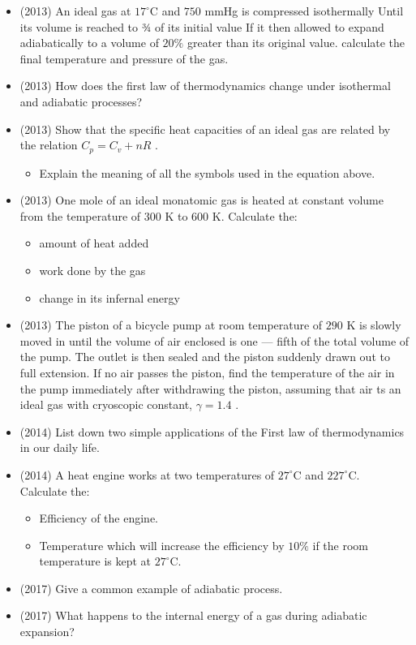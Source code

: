 \documentclass{article}
\begin{document}
\begin{itemize}
\item (2013)  An ideal gas at $ 17^{\circ}$C and $ 750$ mmHg is compressed isothermally Until its volume is reached to ¾ of its initial value If it then allowed to expand adiabatically to a volume of $ 20\%$ greater than its original value. calculate the final temperature and pressure of the gas. 
\item (2013)  How does the first law of thermodynamics change under isothermal and adiabatic processes? 
\item (2013)  Show that the specific heat capacities of an ideal gas are related by the relation $ C_{p}=C_{v}+nR$ .\begin{itemize}
\item Explain the meaning of all the symbols used in the equation above.
\end{itemize}
\item (2013)  One mole of an ideal monatomic gas is heated at constant volume from the temperature of $ 300$ K to $ 600$ K. Calculate the:\begin{itemize}
\item amount of heat added 
\item work done by the gas 
\item change in its infernal energy
\end{itemize}
\item (2013)  The piston of a bicycle pump at room temperature of $ 290$ K is slowly moved in until the volume of air enclosed is one — fifth of the total volume of the pump. The outlet is then sealed and the piston suddenly drawn out to full extension. If no air passes the piston, find the temperature of the air in the pump immediately after withdrawing the piston, assuming that air ts an ideal gas with cryoscopic constant, $ \gamma =1.4$ .
\item (2014)  List down two simple applications of the First law of thermodynamics in our daily life.
\item (2014)  A heat engine works at two temperatures of $ 27^{\circ}$C and $ 227^{\circ}$C. Calculate the:\begin{itemize}
\item Efficiency of the engine. 
\item Temperature which will increase the efficiency by $ 10\%$ if the room temperature is kept at $ 27^{\circ}$C. 
\end{itemize}
\item (2017)  Give a common example of adiabatic process. 
\item (2017)  What happens to the internal energy of a gas during adiabatic expansion?

\end{itemize}
\end{document}
